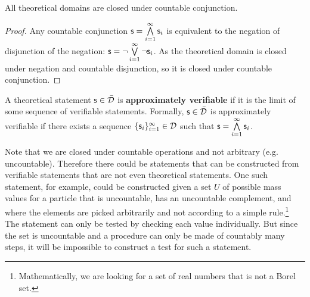 \documentclass[11pt,letterpaper,fleqn]{memoir} %
\begin{document}

\begin{mathSection}
	\begin{prop}
		All theoretical domains are closed under countable conjunction.
	\end{prop}
	
	\begin{proof}
		Any countable conjunction $\mathsf{s} = \bigwedge\limits_{i=1}^{\infty} \mathsf{s}_i$ is equivalent to the negation of disjunction of the negation: $\mathsf{s} = \neg\bigvee\limits_{i=1}^{\infty} \neg\mathsf{s}_i$. As the theoretical domain is closed under negation and countable disjunction, so it is closed under countable conjunction.  
	\end{proof}

	\begin{defn}\label{def_approximately_verifiable}
		A theoretical statement $\mathsf{s} \in \bar{\mathcal{D}}$ is \textbf{approximately verifiable} if it is the limit of some sequence of verifiable statements. Formally, $\mathsf{s} \in \bar{\mathcal{D}}$ is approximately verifiable if there exists a sequence $\{\mathsf{s}_i\}_{i=1}^{\infty} \in \mathcal{D}$ such that $\mathsf{s} = \bigwedge\limits_{i=1}^{\infty} \mathsf{s}_i$.
	\end{defn}
\end{mathSection}

Note that we are closed under countable operations and not arbitrary (e.g. uncountable). Therefore there could be statements that can be constructed from verifiable statements that are not even theoretical statements. One such statement, for example, could be constructed given a set $U$ of possible mass values for a particle that is uncountable, has an uncountable complement, and where the elements are picked arbitrarily and not according to a simple rule.\footnote{Mathematically, we are looking for a set of real numbers that is not a Borel set.} The statement  can only be tested by checking each value individually. But since the set is uncountable and a procedure can only be made of countably many steps, it will be impossible to construct a test for such a statement.
\end{document}
